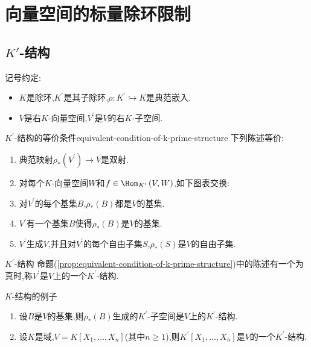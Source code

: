 \chapter{向量空间的标量除环限制}

\section{\texorpdfstring{$K'$}{K'}-结构}

记号约定:

\begin{itemize}
	\item $K$是除环,$K^{\prime}$是其子除环,$\rho:K^{\prime}\hookrightarrow K$是典范嵌入.
	\item $V$是右$K$-向量空间,$V^{\prime}$是$V$的右$K$-子空间.
\end{itemize}

\begin{proposition}{$K^{\prime}$-结构的等价条件}{equivalent-condition-of-k-prime-structure}
	下列陈述等价:
	\begin{enumerate}
		\item 典范映射$\rho_{\ast}\left(V^{\prime}\right)\to V$是双射.
		\item 对每个$K$-向量空间$W$和$f\in\Hom_{K^{\prime}}\left(V,W\right)$,如下图表交换:
		\begin{center}
		\end{center}
		\item 对$V^{\prime}$的每个基集$B$,$\rho_{\ast}\left(B\right)$都是$V$的基集.
		\item $V^{\prime}$有一个基集$B$使得$\rho_{\ast}\left(B\right)$是$V$的基集.
		\item $V^{\prime}$生成$V$,并且对$V^{\prime}$的每个自由子集$S$,$\rho_{\ast}\left(S\right)$是$V$的自由子集.
	\end{enumerate}
\end{proposition}

\begin{definition}{$K^{\prime}$-结构}{}
	命题(\ref{prop:equivalent-condition-of-k-prime-structure})中的陈述有一个为真时,称$V^{\prime}$是$V$上的一个$K^{\prime}$-结构.
\end{definition}

\begin{example}{$K$-结构的例子}{}
	\begin{enumerate}
		\item 设$B$是$V$的基集,则$\rho_{\ast}\left(B\right)$生成的$K^{\prime}$-子空间是$V$上的$K^{\prime}$-结构.
		\item 设$K$是域,$V=K\left[X_{1},\ldots,X_{n}\right]$(其中$n\geq 1$),则$K^{\prime}\left[X_{1},\ldots,X_{n}\right]$是$V$的一个$K^{\prime}$-结构.
	\end{enumerate}
\end{example}






